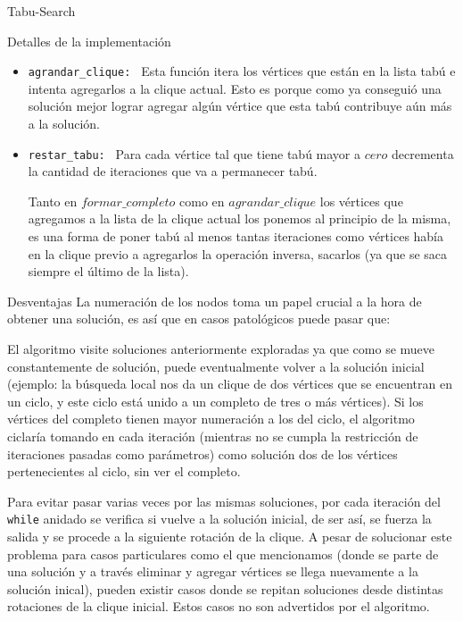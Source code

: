 \begin{section}{Tabu-Search}
\begin{subsection}{Detalles de la implementación}
\begin{itemize}
\begin{itemize}
				\item Si el algoritmo vuelve a la solución inicial y todavía le restan iteraciones del \texttt{while} anidado, queremos evitar que repita exactamente el mismo procedimiento pasando nuevamente por soluciones ya visitadas por lo que forzamos la salida y aplicamos una rotación a dicha solución para explorar nuevas posibilidades.
			\end{itemize}

			\item \texttt{agrandar\_clique: } Esta función itera los vértices que están en la lista tabú e intenta agregarlos a la clique actual. Esto es porque como ya conseguió una solución mejor lograr agregar algún vértice que esta tabú contribuye aún más a la solución.

			\item \texttt{restar\_tabu: } Para cada vértice tal que tiene tabú mayor a $cero$ decrementa la cantidad de iteraciones que va a permanecer tabú.

			Tanto en $formar\_completo$ como en $agrandar\_clique$ los vértices que agregamos a la lista de la clique actual los ponemos al principio de la misma, es una forma de poner tabú al menos tantas iteraciones como vértices había en la clique previo a agregarlos la operación inversa, sacarlos (ya que se saca siempre el último de la lista).
		\end{itemize}
	\end{subsection}

	\begin{subsection}{Desventajas}
		La numeración de los nodos toma un papel crucial a la hora de obtener una solución, es así que en casos patológicos puede pasar que:

		El algoritmo visite soluciones anteriormente exploradas ya que como se mueve constantemente de solución, puede eventualmente volver a la solución inicial (ejemplo: la búsqueda local nos da un clique de dos vértices que se encuentran en un ciclo, y este ciclo está unido a un completo de tres o más vértices). Si los vértices del completo tienen mayor numeración a los del ciclo, el algoritmo ciclaría tomando en cada iteración (mientras no se cumpla la restricción de iteraciones pasadas como parámetros) como solución dos de los vértices pertenecientes al ciclo, sin ver el completo.

		Para evitar pasar varias veces por las mismas soluciones, por cada iteración del \texttt{while} anidado se verifica si vuelve a la solución inicial, de ser así, se fuerza la salida y se procede a la siguiente rotación de la clique.
		A pesar de solucionar este problema para casos particulares como el que mencionamos (donde se parte de una solución y a través eliminar y agregar vértices se llega nuevamente a la solución inical), pueden existir casos donde se repitan soluciones desde distintas rotaciones de la clique inicial. Estos casos no son advertidos por el algoritmo.


\end{subsection}
\end{section}
